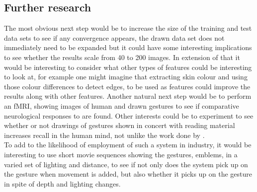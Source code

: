 \documentclass[11pt, a4paper]{article}
\begin{document}
\subsection{Further research}
The most obvious next step would be to increase the size of the training and test data sets to see if any convergence appears, the drawn data set does not immediately need to be expanded but it could have some interesting implications to see whether the results scale from 40 to 200 images. In extension of that it would be interesting to consider what other types of features could be interesting to look at, for example one might imagine that extracting skin colour and using those colour differences to detect edges, to be used as features could improve the results along with other features.
Another natural next step would be to perform an fMRI, showing images of human and drawn gestures to see if comparative neurological responses  to  are found. Other interests could be to experiment to see whether or not drawings of gestures shown in concert with reading material increases recall in the human mind, not unlike the work done by .\\
To add to the likelihood of employment of such a system in industry, it would be interesting to use short movie sequences showing the gestures, emblems, in a varied set of lighting and distance, to see if not only does the system pick up on the gesture when movement is added, but also whether it picks up on the gesture in spite of depth and lighting changes.


\nocite{*}
\end{document}
